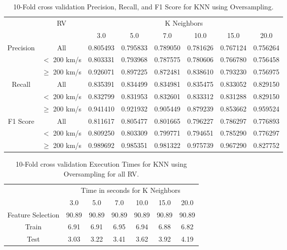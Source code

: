 \documentclass[trackchanges, floatfix, twocolumn, tighten]{aastex62}
\begin{document}
\begin{table}
\centering
\caption{10-Fold cross validation Precision, Recall, and F1 Score for KNN using Oversampling.}
\label{tab:PRFKNND}
	\begin{tabular}{|c|c|c|c|c|c|c|c|}
		\hline
		\multirow{2}{*}{} & \multirow{2}{*}{RV} & \multicolumn{6}{c|}{K Neighbors} \\ 
		        &   &   3.0 &   5.0 &   7.0 &   10.0 &   15.0 &   20.0  \\ \hline \hline
		 \multirow{3}{*}{Precision} & All & 0.805493 & 0.795833 & 0.789050 & 0.781626 & 0.767124 & 0.756264 \\ \cline{2-8}
		& $<$ 200 km/s	 & 0.803331 & 0.793968 & 0.787575 & 0.780606 & 0.766780 & 0.756458 \\ \cline{2-8}
		& $\geq$ 200 km/s	& 0.926071 & 0.897225 & 0.872481 & 0.838610 & 0.793230 & 0.756975 \\ \hline \hline
		 \multirow{3}{*}{Recall} & All   & 0.835391 & 0.834499 & 0.834981 & 0.835475 & 0.833052 & 0.829150 \\ \cline{2-8}
		& $<$ 200 km/s	 & 0.832799 & 0.831953 & 0.832601 & 0.833312 & 0.831288 & 0.829150 \\ \cline{2-8}
		& $\geq$ 200 km/s	& 0.941410 & 0.921932 & 0.905449 & 0.879239 & 0.853662 & 0.959524 \\ \hline \hline
		 \multirow{3}{*}{F1 Score} & All & 0.811617 & 0.805477 & 0.801665 & 0.796227 & 0.786297 & 0.776893 \\ \cline{2-8}
		& $<$ 200 km/s	 & 0.809250 & 0.803309 & 0.799771 & 0.794651 & 0.785290 & 0.776297 \\ \cline{2-8}
		& $\geq$ 200 km/s	& 0.989692 & 0.985351 & 0.981322 & 0.975739 & 0.967290 & 0.827752 \\ \hline
	\end{tabular}
\end{table}

\begin{table}
\centering
\caption{10-Fold cross validation Execution Times for KNN using Oversampling for all RV.}
\label{tab:KNNT}
	\begin{tabular}{|c|c|c|c|c|c|c|}
		\hline
		\multirow{2}{*}{} & \multicolumn{6}{c|}{Time in seconds for K Neighbors} \\ 
		           &   3.0 &   5.0 &   7.0 &   10.0 &   15.0 &   20.0  \\ \hline 
		 Feature Selection & 90.89 & 90.89 & 90.89 & 90.89 & 90.89 & 90.89 \\ \hline
		 Train             &   6.91 &   6.91 &   6.95 &   6.94 &   6.88 &   6.82 \\ \hline
		 Test              &   3.03 &   3.22 &   3.41 &  3.62 &  3.92 &  4.19 \\ \hline
	\end{tabular}
\end{table}
\end{document}
